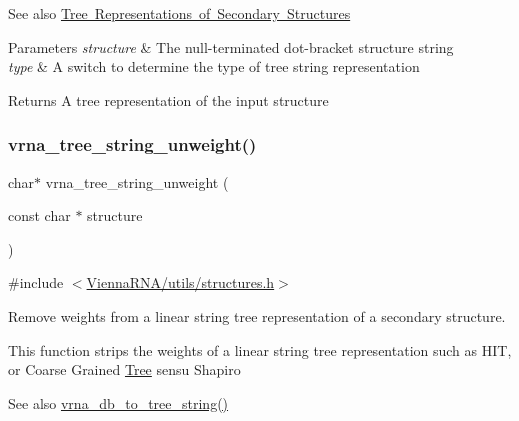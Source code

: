 \begin{DoxySeeAlso}{See also}
\mbox{\hyperlink{rna_structure_notations_sec_structure_representations_tree}{Tree Representations of Secondary Structures}}
\end{DoxySeeAlso}

\begin{DoxyParams}{Parameters}
{\em structure} & The null-\/terminated dot-\/bracket structure string \\
\hline
{\em type} & A switch to determine the type of tree string representation \\
\hline
\end{DoxyParams}
\begin{DoxyReturn}{Returns}
A tree representation of the input {\ttfamily structure} 
\end{DoxyReturn}
\mbox{\label{group__struct__utils__tree_gaa31da26a3f582ddc35a84ff1b9c0a2b0}} 
\subsubsection{\texorpdfstring{vrna\_tree\_string\_unweight()}{vrna\_tree\_string\_unweight()}}
{\footnotesize\ttfamily char$\ast$ vrna\+\_\+tree\+\_\+string\+\_\+unweight (\begin{DoxyParamCaption}\item[{const char $\ast$}]{structure }\end{DoxyParamCaption})}



{\ttfamily \#include $<$\mbox{\hyperlink{utils_2structures_8h}{Vienna\+R\+N\+A/utils/structures.\+h}}$>$}



Remove weights from a linear string tree representation of a secondary structure. 

This function strips the weights of a linear string tree representation such as {\ttfamily H\+IT}, or Coarse Grained \mbox{\hyperlink{structTree}{Tree}} sensu Shapiro \cite{shapiro:1988}

\begin{DoxySeeAlso}{See also}
\mbox{\hyperlink{group__struct__utils__tree_ga56551ab7da64933a7230d29430f40cfe}{vrna\+\_\+db\+\_\+to\+\_\+tree\+\_\+string()}}
\end{DoxySeeAlso}

